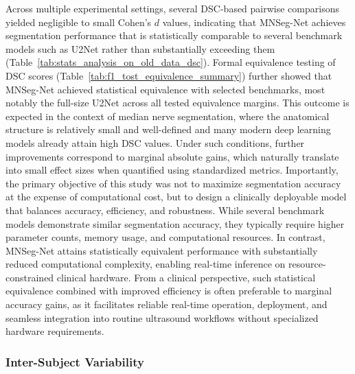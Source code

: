 Across multiple experimental settings, several DSC-based pairwise comparisons yielded negligible to small Cohen’s $d$ values, indicating that MNSeg-Net achieves segmentation performance that is statistically comparable to several benchmark models such as U2Net rather than substantially exceeding them (Table~\ref{tab:stats_analysis_on_old_data_dsc}).  Formal equivalence testing of DSC scores (Table~\ref{tab:f1_tost_equivalence_summary}) further showed that MNSeg-Net achieved statistical equivalence with selected benchmarks, most notably the full-size U2Net across all tested equivalence margins. This outcome is expected in the context of median nerve segmentation, where the anatomical structure is relatively small and well-defined and many modern deep learning models already attain high DSC values. Under such conditions, further improvements correspond to marginal absolute gains, which naturally translate into small effect sizes when quantified using standardized metrics. Importantly, the primary objective of this study was not to maximize segmentation accuracy at the expense of computational cost, but to design a clinically deployable model that balances accuracy, efficiency, and robustness. While several benchmark models demonstrate similar segmentation accuracy, they typically require higher parameter counts, memory usage, and computational resources. In contrast, MNSeg-Net attains statistically equivalent performance
with substantially reduced computational complexity, enabling real-time inference on resource-constrained clinical hardware. From a clinical perspective, such statistical equivalence combined with improved efficiency is often preferable to marginal accuracy gains, as it facilitates reliable real-time operation, deployment, and seamless integration into routine ultrasound workflows without specialized hardware requirements.


\subsubsection{Inter-Subject Variability}

